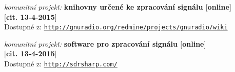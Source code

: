 \begin{thebibliography}{10}
	{\em komunitní projekt:}
		{\bf knihovny určené ke zpracování signálu $[$\textmd{online}$]$ \\$[$\textmd{cit. 13-4-2015}$]$}\\
		Dostupné z: \texttt{\url{http://gnuradio.org/redmine/projects/gnuradio/wiki}}


	{\em komunitní projekt:}
		{\bf software pro zpracování signálu $[$\textmd{online}$]$ \\$[$\textmd{cit. 13-4-2015}$]$}\\
		Dostupné z: \texttt{\url{http://sdrsharp.com/}}


\end{thebibliography}

\clearpage